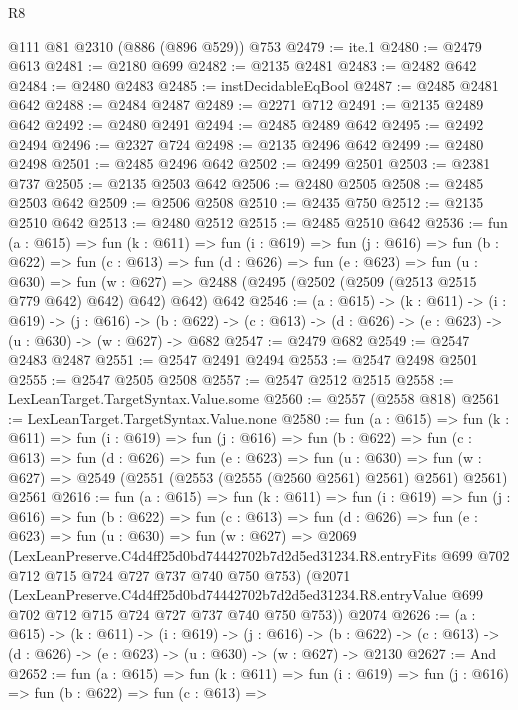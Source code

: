 \begin{lexlean}{R8}
\begin{coremodule}
    @111
    @81
    @2310
    (@886 (@896 @529))
    @753
@2479 := ite.{1}
@2480 := @2479 @613
@2481 := @2180 @699
@2482 := @2135 @2481
@2483 := @2482 @642
@2484 := @2480 @2483
@2485 := instDecidableEqBool
@2487 := @2485 @2481 @642
@2488 := @2484 @2487
@2489 := @2271 @712
@2491 := @2135 @2489 @642
@2492 := @2480 @2491
@2494 := @2485 @2489 @642
@2495 := @2492 @2494
@2496 := @2327 @724
@2498 := @2135 @2496 @642
@2499 := @2480 @2498
@2501 := @2485 @2496 @642
@2502 := @2499 @2501
@2503 := @2381 @737
@2505 := @2135 @2503 @642
@2506 := @2480 @2505
@2508 := @2485 @2503 @642
@2509 := @2506 @2508
@2510 := @2435 @750
@2512 := @2135 @2510 @642
@2513 := @2480 @2512
@2515 := @2485 @2510 @642
@2536 := fun (a : @615) =>
  fun (k : @611) =>
  fun (i : @619) =>
  fun (j : @616) =>
  fun (b : @622) =>
  fun (c : @613) =>
  fun (d : @626) =>
  fun (e : @623) =>
  fun (u : @630) =>
  fun (w : @627) => @2488 (@2495 (@2502 (@2509 (@2513 @2515 @779 @642) @642) @642) @642) @642
@2546 := (a : @615) ->
  (k : @611) ->
  (i : @619) ->
  (j : @616) ->
  (b : @622) -> (c : @613) -> (d : @626) -> (e : @623) -> (u : @630) -> (w : @627) -> @682
@2547 := @2479 @682
@2549 := @2547 @2483 @2487
@2551 := @2547 @2491 @2494
@2553 := @2547 @2498 @2501
@2555 := @2547 @2505 @2508
@2557 := @2547 @2512 @2515
@2558 := LexLeanTarget.TargetSyntax.Value.some
@2560 := @2557 (@2558 @818)
@2561 := LexLeanTarget.TargetSyntax.Value.none
@2580 := fun (a : @615) =>
  fun (k : @611) =>
  fun (i : @619) =>
  fun (j : @616) =>
  fun (b : @622) =>
  fun (c : @613) =>
  fun (d : @626) =>
  fun (e : @623) =>
  fun (u : @630) =>
  fun (w : @627) => @2549 (@2551 (@2553 (@2555 (@2560 @2561) @2561) @2561) @2561) @2561
@2616 := fun (a : @615) =>
  fun (k : @611) =>
  fun (i : @619) =>
  fun (j : @616) =>
  fun (b : @622) =>
  fun (c : @613) =>
  fun (d : @626) =>
  fun (e : @623) =>
  fun (u : @630) =>
  fun (w : @627) =>
  @2069
    (LexLeanPreserve.C4d4ff25d0bd74442702b7d2d5ed31234.R8.entryFits
      @699
      @702
      @712
      @715
      @724
      @727
      @737
      @740
      @750
      @753)
    (@2071
      (LexLeanPreserve.C4d4ff25d0bd74442702b7d2d5ed31234.R8.entryValue
        @699
        @702
        @712
        @715
        @724
        @727
        @737
        @740
        @750
        @753))
    @2074
@2626 := (a : @615) ->
  (k : @611) ->
  (i : @619) ->
  (j : @616) ->
  (b : @622) -> (c : @613) -> (d : @626) -> (e : @623) -> (u : @630) -> (w : @627) -> @2130
@2627 := And
@2652 := fun (a : @615) =>
  fun (k : @611) =>
  fun (i : @619) =>
  fun (j : @616) =>
  fun (b : @622) =>
  fun (c : @613) =>

\end{coremodule}
\end{lexlean}
